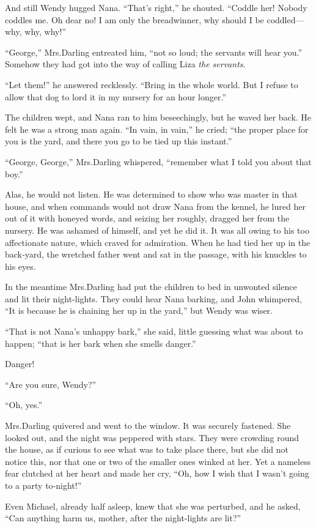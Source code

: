 And still Wendy hugged Nana.
“That’s right,” he shouted.
“Coddle her!
Nobody coddles me.
Oh dear no!
I am only the breadwinner, why should I be coddled—why, why, why!”

“George,” Mrs.\@ Darling entreated him, “not so loud;
the servants will hear you.”
Somehow they had got into the way of calling Liza \emph{the servants}.

“Let them!\@” he answered recklessly.
“Bring in the whole world.
But I refuse to allow that dog to lord it in my nursery for an hour longer.”

The children wept, and Nana ran to him beseechingly, but he waved her back.
He felt he was a strong man again.
“In vain, in vain,” he cried;
“the proper place for you is the yard,
and there you go to be tied up this instant.”

“George, George,” Mrs.\@ Darling whispered, “remember what I told you about that boy.”

Alas, he would not listen.
He was determined to show who was master in that house,
and when commands would not draw Nana from the kennel,
he lured her out of it with honeyed words,
and seizing her roughly, dragged her from the nursery.
He was ashamed of himself, and yet he did it.
It was all owing to his too affectionate nature,
which craved for admiration.
When he had tied her up in the back‐yard,
the wretched father went and sat in the passage,
with his knuckles to his eyes.

In the meantime Mrs.\@ Darling had put the children to bed in unwonted silence and lit their night‐lights.
They could hear Nana barking,
and John whimpered, “It is because he is chaining her up in the yard,” but Wendy was wiser.

“That is not Nana’s unhappy bark,” she said,
little guessing what was about to happen;
“that is her bark when she smells danger.”

Danger!

“Are you sure, Wendy?”

“Oh, yes.”

Mrs.\@ Darling quivered and went to the window.
It was securely fastened.
She looked out, and the night was peppered with stars.
They were crowding round the house,
as if curious to see what was to take place there,
but she did not notice this,
nor that one or two of the smaller ones winked at her.
Yet a nameless fear clutched at her heart and made her cry,
“Oh, how I wish that I wasn’t going to a party to‐night!”

Even Michael, already half asleep, knew that she was perturbed,
and he asked, “Can anything harm us, mother, after the night‐lights are lit?”

